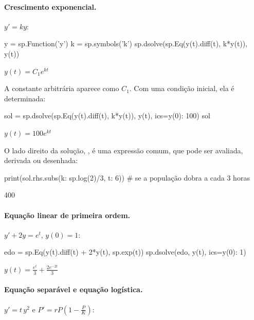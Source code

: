\paragraph{Crescimento exponencial.} $y'=ky$:

\begin{entrada}
y = sp.Function('y')
k = sp.symbols('k')
sp.dsolve(sp.Eq(y(t).diff(t), k*y(t)), y(t))
\end{entrada}
\begin{saidamat}
$\displaystyle y{\left(t \right)} = C_{1} e^{k t}$
\end{saidamat}

A constante arbitrária aparece como $C_1$. Com uma condição inicial, ela é determinada:

\begin{entrada}
sol = sp.dsolve(sp.Eq(y(t).diff(t), k*y(t)), y(t), ics={y(0): 100})
sol
\end{entrada}
\begin{saidamat}
$\displaystyle y{\left(t \right)} = 100 e^{k t}$
\end{saidamat}

O lado direito da solução, , é uma expressão comum, que pode ser avaliada, derivada ou desenhada:

\begin{entrada}
print(sol.rhs.subs({k: sp.log(2)/3, t: 6}))     # se a população dobra a cada 3 horas
\end{entrada}
\begin{saida}
400
\end{saida}

\paragraph{Equação linear de primeira ordem.} $y'+2y=e^{t}$, $y(0)=1$:

\begin{entrada}
edo = sp.Eq(y(t).diff(t) + 2*y(t), sp.exp(t))
sp.dsolve(edo, y(t), ics={y(0): 1})
\end{entrada}
\begin{saidamat}
$\displaystyle y{\left(t \right)} = \frac{e^{t}}{3} + \frac{2 e^{- 2 t}}{3}$
\end{saidamat}

\paragraph{Equação separável e equação logística.} $y'=t\,y^2$ e $P'=rP\left(1-\frac{P}{K}\right)$:


